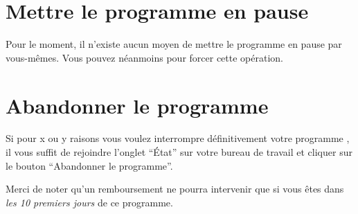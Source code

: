 % 
% 
% 
% 
% 
% 
% 
% 

\section{Mettre le programme en pause}\hypertarget{programme-en-pause}{}\label{programme-en-pause}

Pour le moment, il n'existe aucun moyen de mettre le programme en pause par vous-mêmes. Vous pouvez néanmoins  pour forcer cette opération.

\section{Abandonner le programme}\hypertarget{abandonner-le-programme}{}\label{abandonner-le-programme}

Si pour x ou y raisons vous voulez interrompre définitivement votre programme \unan{}, il vous suffit de rejoindre l'onglet ``État'' sur votre bureau de travail et cliquer sur le bouton ``Abandonner le programme''.

Merci de noter qu'un remboursement ne pourra intervenir que si vous êtes dans \emph{les 10 premiers jours} de ce programme.

